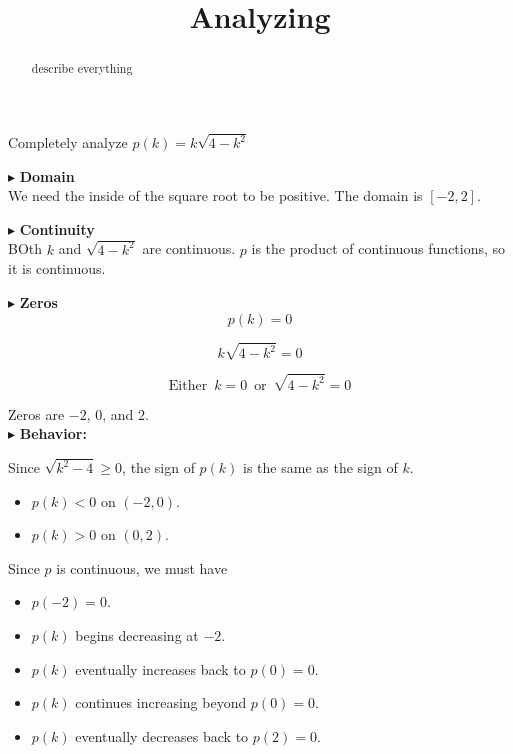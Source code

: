 \documentclass{ximera}
\title{Analyzing}
\begin{document}
\begin{abstract}
describe everything
\end{abstract}
\maketitle







Completely analyze $p(k) = k \sqrt{4-k^2}$






$\blacktriangleright$  \textbf{\textcolor{blue!55!black}{Domain}} \\

We need the inside of the square root to be positive.  The domain is $[-2, 2]$.





$\blacktriangleright$  \textbf{\textcolor{blue!55!black}{Continuity}} \\

BOth $k$ and $\sqrt{4 - k^2}$ are continuous.  $p$ is the product of continuous functions, so it is continuous.



$\blacktriangleright$  \textbf{\textcolor{blue!55!black}{Zeros}} \\


\[  p(k) = 0   \]

\[  k \sqrt{4-k^2} = 0  \]

\[
\text{Either } \, k = 0 \, \text{ or } \, \sqrt{4-k^2} = 0
\]


Zeros are $-2$, $0$, and $2$. \\




$\blacktriangleright$ \textbf{Behavior:} 


Since $\sqrt{k^2 - 4} \geq 0$, the sign of $p(k)$ is the same as the sign of $k$.

\begin{itemize}
\item  $p(k) < 0$ on $(-2, 0)$.
\item  $p(k) > 0$ on $(0, 2)$.
\end{itemize}


Since $p$ is continuous, we must have 


\begin{itemize}
\item  $p(-2) = 0$.
\item  $p(k)$ begins decreasing at $-2$.
\item  $p(k)$ eventually increases back to $p(0) = 0$.
\item  $p(k)$ continues increasing beyond $p(0) = 0$.
\item  $p(k)$ eventually decreases back to $p(2) = 0$.
\end{itemize}
\end{document}
